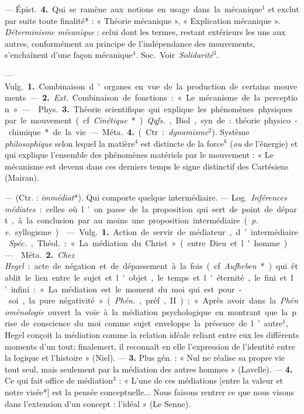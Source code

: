 \begin{itemize}[leftmargin=1cm, label=, itemsep=1pt]
— \si{Épist.} {\bf 4.} Qui se ramène aux notions en usage dans la
mécanique$^1$ et exclut par suite toute finalité* : « Théorie mécanique »,
« Explication mécanique ». {\it Déterminisme mécanique} : celui dont les
termes, restant extérieurs les uns aux autres, conformément au principe de
l’indépendance des mouvements, s’enchaînent d’une façon mécanique$^4$.
\si{Soc.} Voir {\it Solidarité}$^3$.

 —  \si{Vulg.} {\bf 1.} Combinaison d'organes en vue de la
production de certains mouvements. —  {\bf 2.} {\it Ext.} Combinaison de
fonctions : « Le mécanisme de la perception ».

—  \si{Phys.} {\bf 3.} Théorie scientifique qui explique les
phénomènes physiques par le mouvement (cf. {\it Cinétique}*). {\it Qqfs.},
Biol, syn. de : théorie physico-chimique* de la vie. — \si{Méta.} {\bf 4.}
(Ctr. : {\it dynamisme}$^2$). Système {\it philosophique} selon lequel la
matière$^4$ est distincte de la force$^6$ ({\it ou} de l'énergie) et qui
explique
l’ensemble des phénomènes matériels par le mouvement : « Le mécanisme est
devenu dans ces derniers temps le signe distinctif des Cartésiens (Mairan).

 — (Ctr. : {\it immédiat}*). Qui comporte quelque intermédiaire. —
\si{Log.} {\it Inférences médiates} : celles où l'on passe de la proposition
qui sert de point de départ, à la conclusion par au moins une proposition
intermédiaire ({\it p. e.} syllogisme).

 — \si{Vulg.} {\bf 1.} Action de servir de médiateur,
d’intermédiaire. {\it Spéc.}, \si{Théol.} : « La médiation du Christ » (entre
Dieu et l'homme).

—  \si{Méta.} {\bf 2.} {\it Chez Hegel} : acte de négation et
de dépassement à la fois (cf. {\it Aufheben}*) qui établit le lien entre le
sujet et l’objet, le temps et l'éternité, le fini et l'infini : « La
médiation est le moment du moi qui est pour-soi, la pure négativité »
({\it Phén.}, préf., II) ; « Après avoir dans la {\it Phénoménologie} ouvert
la voie à la médiation psychologique en montrant que la prise de conscience
du moi comme sujet enveloppe la présence de l’autre$^1$, Hegel conçoit la
médiation comme la relation idéale reliant entre eux les différents moments
d’un tout; finalemert, il reconnaît en elle l'expression de l'identité entre
la logique et l’histoire » (Niel). — {\bf 3.} Plus gén. : « Nul ne réalise sa
propre vie tout seul, mais seulement par la médiation des autres
hommes » (Lavelle). —  {\bf 4.} Ce qui fait office de
médiation$^3$ : « L’une de ces médiations [entre la valeur et notre visée*]
est la pensée conceptuelle... Nous faisons rentrer ce que nous visons dans
l’extension d’un concept : l’idéal » (Le Senne).


\end{itemize}
